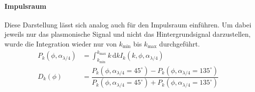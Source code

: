 \documentclass[titlepage,  ngerman]{article}
\begin{document}
		\paragraph{Impulsraum}
		Diese Darstellung lässt sich analog auch für den Impulsraum einführen. Um dabei jeweils nur das plasmonische Signal und nicht das Hintergrundsignal darzustellen, wurde die Integration wieder nur von  $k_\mathrm{min}$ bis $k_\mathrm{max}$ durchgeführt.
		\begin{align}
			P_k(\phi, \alpha_{\lambda/4}) &= \int_{k_\mathrm{min}}^{k_\mathrm{max}}k\,\mathrm{d}k I_k(k, \phi, \alpha_{\lambda /4}) \\
			D_k(\phi) &= \dfrac{P_k(\phi, \alpha_{\lambda/4} = 45^\circ) - P_k(\phi, \alpha_{\lambda/4} = 135^\circ)}{P_k(\phi, \alpha_{\lambda/4} = 45^\circ) + P_k(\phi, \alpha_{\lambda/4} = 135^\circ)}
		\end{align}
\end{document}
